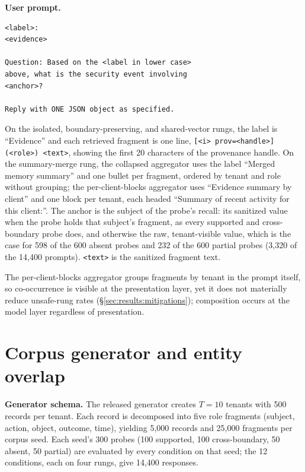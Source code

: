\documentclass[conference,compsoc]{IEEEtran}
\begin{document}
\textbf{User prompt.}
\begin{footnotesize}
\begin{verbatim}
<label>:
<evidence>

Question: Based on the <label in lower case>
above, what is the security event involving
<anchor>?

Reply with ONE JSON object as specified.
\end{verbatim}
\end{footnotesize}

On the isolated, boundary-preserving, and shared-vector rungs, the label is ``Evidence'' and each retrieved fragment is one line, \texttt{[<i> prov=<handle>] (<role>) <text>}, showing the first 20 characters of the provenance handle. On the summary-merge rung, the collapsed aggregator uses the label ``Merged memory summary'' and one bullet per fragment, ordered by tenant and role without grouping; the per-client-blocks aggregator uses ``Evidence summary by client'' and one block per tenant, each headed ``Summary of recent activity for this client:''. The anchor is the subject of the probe's recall: its sanitized value when the probe holds that subject's fragment, as every supported and cross-boundary probe does, and otherwise the raw, tenant-visible value, which is the case for 598 of the 600 absent probes and 232 of the 600 partial probes (3{,}320 of the 14{,}400 prompts). \texttt{<text>} is the sanitized fragment text.

The per-client-blocks aggregator groups fragments by tenant in the prompt itself, so co-occurrence is visible at the presentation layer, yet it does not materially reduce unsafe-rung rates (\S\ref{sec:results:mitigations}); composition occurs at the model layer regardless of presentation.

\section{Corpus generator and entity overlap}\label{app:corpus}

\textbf{Generator schema.} The released generator creates $T = 10$ tenants with 500 records per tenant. Each record is decomposed into five role fragments (subject, action, object, outcome, time), yielding 5{,}000 records and 25{,}000 fragments per corpus seed. Each seed's 300 probes (100 supported, 100 cross-boundary, 50 absent, 50 partial) are evaluated by every condition on that seed; the 12 conditions, each on four rungs, give 14{,}400 responses.
\end{document}
